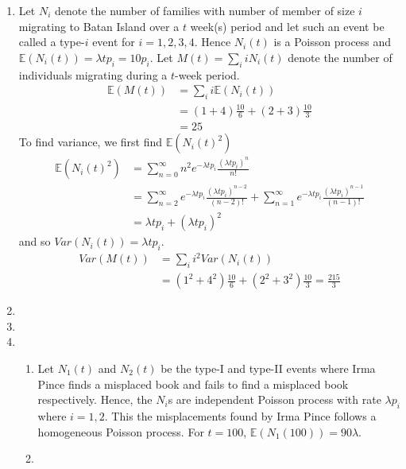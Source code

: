 \documentclass[a4paper,10pt]{article}
\theoremstyle{definition}
\begin{document}
\begin{enumerate}
\item Let $N_i$ denote the number of families with number of member of size $i$ migrating to Batan Island over a $t$ week(s) period and let such an event be called a type-$i$ event for $i=1,2,3,4$. Hence $N_i(t)$ is a Poisson process and $\mathbb{E}(N_i(t))=\lambda t p_i=10p_i$. Let $M(t)=\sum_{i}iN_i(t)$ denote the number of individuals migrating during a $t$-week period. 
\begin{align*}
\mathbb{E}(M(t))&=\sum_{i}i\mathbb{E}(N_i(t))\\
&=(1+4)\frac{10}{6}+(2+3)\frac{10}{3}\\
&=25
\end{align*}
To find variance, we first find $\mathbb{E}(N_i(t)^2)$
\begin{align*}
\mathbb{E}(N_i(t)^2)&=\sum_{n=0}^{\infty}n^2e^{-\lambda t p_i}\frac{(\lambda t p_i)^n}{n!}\\
&=\sum_{n=2}^{\infty}e^{-\lambda t p_i}\frac{(\lambda t p_i)^{n-2}}{(n-2)!}+\sum_{n=1}^{\infty}e^{-\lambda t p_i}\frac{(\lambda t p_i)^{n-1}}{(n-1)!}\\
&=\lambda t p_i+(\lambda t p_i)^2
\end{align*}
and so $Var(N_i(t))=\lambda t p_i$.
\begin{align*}
Var(M(t))&=\sum_{i}i^2Var(N_i(t))\\
&=(1^2+4^2)\frac{10}{6}+(2^2+3^2)\frac{10}{3}=\frac{215}{3}
\end{align*}

\item

\item

\item
\begin{enumerate}
\item Let $N_1(t)$ and $N_2(t)$ be the type-I and type-II events where Irma Pince finds a misplaced book and fails to find a misplaced book respectively. Hence, the $N_i$s are independent Poisson process with rate $\lambda p_i$ where $i=1,2$. This the misplacements found by Irma Pince follows a homogeneous Poisson process. For $t=100$, $\mathbb{E}(N_1(100))=90 \lambda$.
\item



\end{enumerate}
\end{enumerate}
\end{document}
